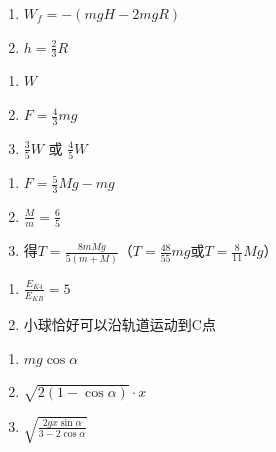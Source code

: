 \item \begin {enumerate} \renewcommand {\labelenumi }{\arabic {enumi}.} \item $W _ { f } = - ( m g H - 2 m g R )$ \item $h = \frac { 2 } { 3 } R$ \par \par \end {enumerate} \par \par 
\item \begin {enumerate} \renewcommand {\labelenumi }{\arabic {enumi}.} \item $ W $ \item $F = \frac { 4 } { 3 } m g$ \item $\frac { 3 } { 5 } W$ 或 $\frac { 4 } { 5 } W$ \end {enumerate} \par \par 
\item \begin {enumerate} \renewcommand {\labelenumi }{\arabic {enumi}.} \item $F = \frac { 5 } { 3 } M g - m g$ \item $\frac { M } { m } = \frac { 6 } { 5 }$ \item 得$T = \frac { 8 m M g } { 5 ( m + M ) }$（$T = \frac { 48 } { 55 } m g$或$T = \frac { 8 } { 11 } M g$） \par \end {enumerate} \par \par 
\item \begin {enumerate} \renewcommand {\labelenumi }{\arabic {enumi}.} \item $\frac { E _ { K 4 } } { E _ { K B } } = 5$ \item 小球恰好可以沿轨道运动到C点 \par \par \end {enumerate} \par \par 
\item \begin {enumerate} \renewcommand {\labelenumi }{\arabic {enumi}.} \item $ mg \cos \alpha $ \item $\sqrt { 2 ( 1 - \cos \alpha ) } \cdot x$ \item $\sqrt { \frac { 2 g x \sin \alpha } { 3 - 2 \cos \alpha } }$ \par \end {enumerate} \par \par 
